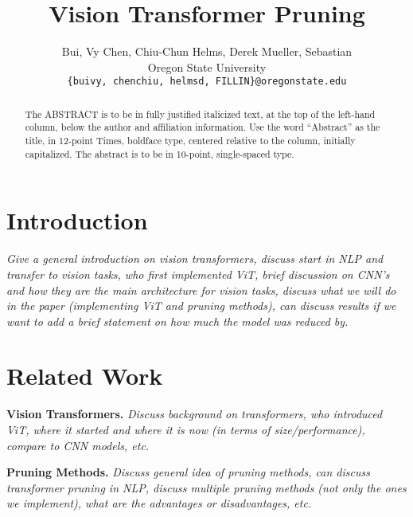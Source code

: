 \documentclass[10pt,twocolumn,letterpaper]{article}
\newcommand{\xhdr}[1]{\vspace{3pt}\noindent\textbf{#1}}
\begin{document}
\title{Vision Transformer Pruning}

\author{Bui, Vy \hspace{20pt} Chen, Chiu-Chun \hspace{20 pt} Helms, Derek \hspace{20 pt} Mueller, Sebastian \\
Oregon State University\\
{\tt\small \{buivy, chenchiu, helmsd, FILLIN\}@oregonstate.edu}
}
\maketitle

\begin{abstract}
   The ABSTRACT is to be in fully justified italicized text, at the top of the left-hand column, below the author and affiliation information.
   Use the word ``Abstract'' as the title, in 12-point Times, boldface type, centered relative to the column, initially capitalized.
   The abstract is to be in 10-point, single-spaced type.
\end{abstract}


\section{Introduction}
\label{sec:intro}
\textit{Give a general introduction on vision transformers, discuss start in NLP and transfer to vision tasks, who first implemented ViT, brief discussion on CNN's and how they are the main architecture for vision tasks, discuss what we will do in the paper (implementing ViT and pruning methods), can discuss results if we want to add a brief statement on how much the model was reduced by.}


\section{Related Work}
\label{sec:related work}

\xhdr{Vision Transformers.}
\textit{Discuss background on transformers, who introduced ViT, where it started and where it is now (in terms of size/performance), compare to CNN models, etc.}

\xhdr{Pruning Methods.}
\textit{Discuss general idea of pruning methods, can discuss transformer pruning in NLP, discuss multiple pruning methods (not only the ones we implement), what are the advantages or disadvantages, etc.}
\end{document}
